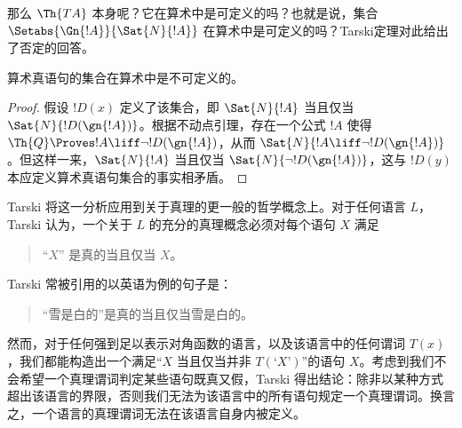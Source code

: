 \documentclass[../../../include/open-logic-section]{subfiles}
\begin{document}
那么 $\Th{TA}$ 本身呢？它在算术中是可定义的吗？也就是说，集合 $\Setabs{\Gn{!A}}{\Sat{N}{!A}}$ 在算术中是可定义的吗？Tarski定理对此给出了否定的回答。

\begin{thm}
算术真语句的集合在算术中是不可定义的。
\end{thm}

\begin{proof}
假设 $!D(x)$ 定义了该集合，即 $\Sat{N}{!A}$ 当且仅当 $\Sat{N}{!D(\gn{!A})}$。根据不动点引理，存在一个公式 $!A$ 使得 $\Th{Q} \Proves !A \liff \lnot !D(\gn{!A})$，从而 $\Sat{N}{!A \liff \lnot !D(\gn{!A})}$。但这样一来，$\Sat{N}{!A}$ 当且仅当 $\Sat{N}{\lnot !D(\gn{!A})}$，这与 $!D(y)$ 本应定义算术真语句集合的事实相矛盾。
\end{proof}

Tarski 将这一分析应用到关于真理的更一般的哲学概念上。对于任何语言 $L$，Tarski 认为，一个关于 $L$ 的充分的真理概念必须对每个语句 $X$ 满足
\begin{quote}
“$X$” 是真的当且仅当 $X$。
\end{quote}
Tarski 常被引用的以英语为例的句子是：
\begin{quote}
“雪是白的”是真的当且仅当雪是白的。
\end{quote}
然而，对于任何强到足以表示对角函数的语言，以及该语言中的任何谓词 $T(x)$，我们都能构造出一个满足“$X$ 当且仅当并非 $T(\text{`$X$'})$”的语句 $X$。考虑到我们不会希望一个真理谓词判定某些语句既真又假，Tarski 得出结论：除非以某种方式超出该语言的界限，否则我们无法为该语言中的所有语句规定一个真理谓词。换言之，一个语言的真理谓词无法在该语言自身内被定义。
\end{document}
